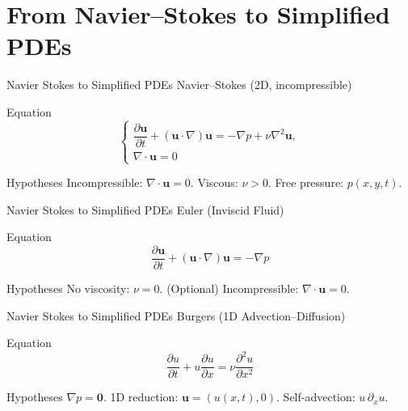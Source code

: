 \section{From Navier--Stokes to Simplified PDEs}

\begin{frame}{Navier Stokes to Simplified PDEs}
\small
\textcolor{red_unipd}{\Large Navier--Stokes (2D, incompressible)}

\vspace{0.6em}

\begin{alertblock}{Equation}
\[
\begin{cases}
\dfrac{\partial \mathbf{u}}{\partial t} 
+ (\mathbf{u}\!\cdot\!\nabla)\mathbf{u}
= -\nabla p + \nu\nabla^2 \mathbf{u},\\[4pt]
\nabla\!\cdot\!\mathbf{u} = 0
\end{cases}
\]
\end{alertblock}

\vfill

\begin{block}{Hypotheses}
Incompressible: \(\nabla\!\cdot\!\mathbf{u} = 0\). \quad
Viscous: \(\nu>0\). \quad
Free pressure: \(p(x,y,t)\).
\end{block}
\end{frame}


\begin{frame}{Navier Stokes to Simplified PDEs}
\small
\textcolor{red_unipd}{\Large Euler (Inviscid Fluid)}

\vspace{0.6em}

\begin{alertblock}{Equation}
\[
\dfrac{\partial \mathbf{u}}{\partial t} 
+ (\mathbf{u}\!\cdot\!\nabla)\mathbf{u}
= -\nabla p
\]
\end{alertblock}

\vfill

\begin{block}{Hypotheses}
No viscosity: \(\nu = 0\). \quad
(Optional) Incompressible: \(\nabla\!\cdot\!\mathbf{u}=0\).
\end{block}
\end{frame}


\begin{frame}{Navier Stokes to Simplified PDEs}
\small
\textcolor{red_unipd}{\Large Burgers (1D Advection–Diffusion)}

\vspace{0.6em}

\begin{alertblock}{Equation}
\[
\dfrac{\partial u}{\partial t} + u\dfrac{\partial u}{\partial x}
= \nu\dfrac{\partial^2 u}{\partial x^2}
\]
\end{alertblock}

\vfill

\begin{block}{Hypotheses}
\(\nabla p=\mathbf{0}\). \quad
1D reduction: \(\mathbf{u}=(u(x,t),0)\). \quad
Self-advection: \(u\,\partial_x u\).
\end{block}
\end{frame}



